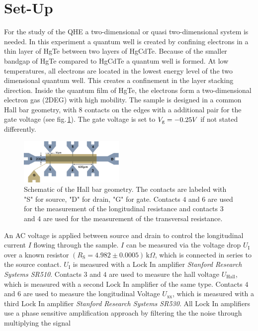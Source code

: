 \section{Set-Up}
For the study of the QHE a two-dimensional or quasi two-dimensional system is needed.
In this experiment a quantum well is created by confining electrons in a thin layer of HgTe between
two layers of HgCdTe. Because of the smaller bandgap of HgTe compared to HgCdTe a quantum well is formed. 
At low temperatures, all electrons are located in the lowest energy level of the 
two dimensional quantum well. This creates a confinement in the layer stacking direction.
Inside the quantum film of HgTe, the electrons form a two-dimensional electron gas (2DEG) with high mobility.
The sample is designed in a common Hall bar geometry,
with $8$ contacts on the edges with a additional pair for the gate voltage (see fig.\,\ref{fig:HallBar}).
The gate voltage is set to $V_\text g = -0.25V$ if not stated differently.
\begin{figure}[h]
    \centering
    \includegraphics[width=0.45\textwidth]{../Images/HallBar.png}
    \caption{Schematic of the Hall bar geometry. The contacts are labeled with "S" for source, "D" for drain,
    "G" for gate. Contacts $4$ and $6$ are used for the measurement of the longitudinal resistance 
    and contacts $3$ and $4$ are used for the measurement of the transversal resistance.}
    \label{fig:HallBar}
\end{figure}
An AC voltage is applied between source and drain to control the longitudinal current $I$
flowing through the sample. $I$ can be measured via the voltage drop $U_\text{I}$ over a known resistor $(R_\text{S}=4.982\pm0.0005)\,\text{k}\Omega$, 
which is connected in series to the source contact. $U_\text{I}$ is measured with a Lock In amplifier 
\emph{Stanford Research Systems SR510}. Contacts $3$ and $4$ are used to measure the hall voltage $U_\text{Hall}$, which
is measured with a second Lock In amplifier of the same type. Contacts $4$ and $6$ are used to measure
the longitudinal Voltage $U_\text{xx}$, which is measured with a third Lock In amplifier \emph{Stanford Research Systems SR530}.
All Lock In amplifiers use a phase sensitive amplification approach by filtering the the noise through multiplying the signal
